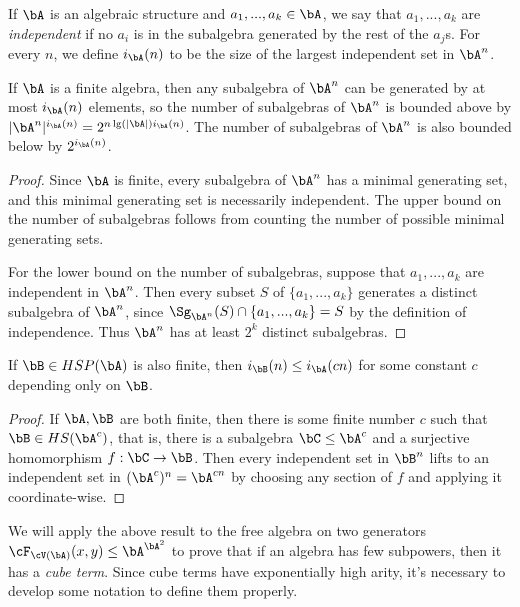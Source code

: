 \begin{defn} If $\bA$ is an algebraic structure and $a_1, ..., a_k \in \bA$, we say that $a_1, ..., a_k$ are \emph{independent} if no $a_i$ is in the subalgebra generated by the rest of the $a_j$s. For every $n$, we define $i_\bA(n)$ to be the size of the largest independent set in $\bA^n$.
\end{defn}

\begin{prop} If $\bA$ is a finite algebra, then any subalgebra of $\bA^n$ can be generated by at most $i_\bA(n)$ elements, so the number of subalgebras of $\bA^n$ is bounded above by $|\bA^n|^{i_\bA(n)} = 2^{n\lg(|\bA|)i_\bA(n)}$. The number of subalgebras of $\bA^n$ is also bounded below by $2^{i_\bA(n)}$.
\end{prop}
\begin{proof} Since $\bA$ is finite, every subalgebra of $\bA^n$ has a minimal generating set, and this minimal generating set is necessarily independent. The upper bound on the number of subalgebras follows from counting the number of possible minimal generating sets.

For the lower bound on the number of subalgebras, suppose that $a_1, ..., a_k$ are independent in $\bA^n$. Then every subset $S$ of $\{a_1, ..., a_k\}$ generates a distinct subalgebra of $\bA^n$, since $\Sg_{\bA^n}(S) \cap \{a_1, ..., a_k\} = S$ by the definition of independence. Thus $\bA^n$ has at least $2^k$ distinct subalgebras.
\end{proof}

\begin{prop} If $\bB \in HSP(\bA)$ is also finite, then $i_\bB(n) \le i_\bA(cn)$ for some constant $c$ depending only on $\bB$.
\end{prop}
\begin{proof} If $\bA,\bB$ are both finite, then there is some finite number $c$ such that $\bB \in HS(\bA^c)$, that is, there is a subalgebra $\bC \le \bA^c$ and a surjective homomorphism $f : \bC \rightarrow \bB$. Then every independent set in $\bB^n$ lifts to an independent set in $(\bA^c)^n = \bA^{cn}$ by choosing any section of $f$ and applying it coordinate-wise.
\end{proof}

We will apply the above result to the free algebra on two generators $\cF_{\cV(\bA)}(x,y) \le \bA^{\bA^2}$ to prove that if an algebra has few subpowers, then it has a \emph{cube term}. Since cube terms have exponentially high arity, it's necessary to develop some notation to define them properly.

